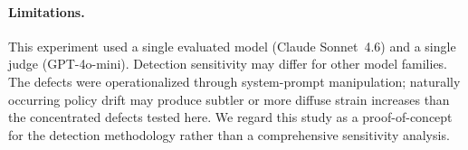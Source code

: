 \paragraph{Limitations.}
This experiment used a single evaluated model (Claude Sonnet~4.6) and a single
judge (GPT-4o-mini). Detection sensitivity may differ for other model families.
The defects were operationalized through system-prompt manipulation; naturally
occurring policy drift may produce subtler or more diffuse strain increases
than the concentrated defects tested here. We regard this study as a
proof-of-concept for the detection methodology rather than a comprehensive
sensitivity analysis.

